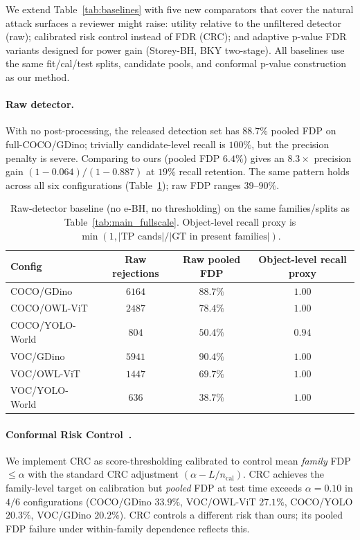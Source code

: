 \documentclass{article}
\theoremstyle{remark}
\newcommand{\1}{\mathbf{1}}
\begin{document}
We extend Table~\ref{tab:baselines} with five new comparators that cover
the natural attack surfaces a reviewer might raise: utility relative to
the unfiltered detector (raw); calibrated risk control instead of FDR
(CRC); and adaptive p-value FDR variants designed for power gain
(Storey-BH, BKY two-stage). All baselines use the same fit/cal/test
splits, candidate pools, and conformal p-value construction as our
method.

\paragraph{Raw detector.}
With no post-processing, the released detection set has $88.7\%$
pooled FDP on full-COCO/GDino; trivially candidate-level recall is
$100\%$, but the precision penalty is severe. Comparing to
ours (pooled FDP $6.4\%$) gives an $8.3\times$ precision gain
$(1-0.064)/(1-0.887)$ at $19\%$ recall retention. The same pattern
holds across all six configurations
(Table~\ref{tab:raw_detector_full}); raw FDP ranges $39$--$90\%$.

\begin{table}[h]
\centering
\small
\begin{tabular*}{\linewidth}{@{\extracolsep{\fill}}lccc@{}}
\toprule
Config & Raw rejections & Raw pooled FDP & Object-level recall proxy \\
\midrule
COCO/GDino       & $6164$ & $88.7\%$ & $1.00$ \\
COCO/OWL-ViT     & $2487$ & $78.4\%$ & $1.00$ \\
COCO/YOLO-World  & $ 804$ & $50.4\%$ & $0.94$ \\
VOC/GDino        & $5941$ & $90.4\%$ & $1.00$ \\
VOC/OWL-ViT      & $1447$ & $69.7\%$ & $1.00$ \\
VOC/YOLO-World   & $ 636$ & $38.7\%$ & $1.00$ \\
\bottomrule
\end{tabular*}
\caption{Raw-detector baseline (no e-BH, no thresholding) on the same
families/splits as Table~\ref{tab:main_fullscale}. Object-level recall
proxy is $\min(1, |\text{TP cands}|/|\text{GT in present families}|)$.}
\label{tab:raw_detector_full}
\end{table}

\paragraph{Conformal Risk Control~\cite{angelopoulos2024conformal}.}
We implement CRC as score-thresholding calibrated to control mean
\emph{family} FDP $\le \alpha$ with the standard CRC adjustment
$(\alpha - L/n_{\mathrm{cal}})$. CRC achieves the family-level
target on calibration but \emph{pooled} FDP at test time exceeds
$\alpha\!=\!0.10$ in $4/6$ configurations
(COCO/GDino $33.9\%$, VOC/OWL-ViT $27.1\%$, COCO/YOLO $20.3\%$,
VOC/GDino $20.2\%$). CRC controls a different risk than ours;
its pooled FDP failure under within-family dependence reflects this.
\end{document}
